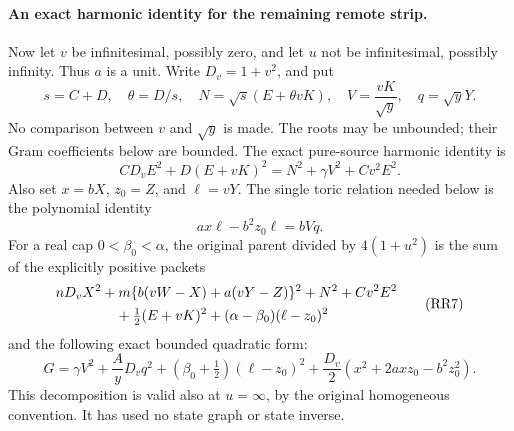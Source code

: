 \paragraph{An exact harmonic identity for the remaining remote strip.}
Now let $v$ be infinitesimal, possibly zero, and let $u$ not be
infinitesimal, possibly infinity.  Thus $a$ is a unit.
Write $D_v=1+v^2$, and put
\[
 s=C+D,\quad\theta=D/s,\quad
 N=\sqrt{s}(E+\theta vK),\quad
 V=\frac{vK}{\sqrt y},\quad q=\sqrt yY.
\]
No comparison between $v$ and $\sqrt y$ is made.  The roots may be
unbounded; their Gram coefficients below are bounded.  The exact
pure-source harmonic identity is
\[
 CD_vE^2+D(E+vK)^2=N^2+\gamma V^2+Cv^2E^2.               \tag{RR5}
\]
Also set $x=bX$, $z_0=Z$, and $\ell=vY$.  The single toric relation
needed below is the polynomial identity
\[
 a x\ell-b^2z_0\ell=bVq.                                \tag{RR6}
\]
For a real cap $0<\beta_0<\alpha$, the original parent divided
by $4(1+u^2)$ is the sum of the explicitly positive packets
\[
 \begin{split}
 &nD_vX^2+m\{b(vW-X)+a(vY-Z)\}^2+N^2+Cv^2E^2\\
 &\hspace{15mm}+\tfrac12(E+vK)^2+(\alpha-\beta_0)(\ell-z_0)^2
 \end{split}                                             \tag{RR7}
\]
and the following exact bounded quadratic form:
\[
 G=\gamma V^2+\frac AyD_vq^2
 +(\beta_0+\tfrac12)(\ell-z_0)^2
 +\frac{D_v}{2}(x^2+2axz_0-b^2z_0^2).                   \tag{RR8}
\]
This decomposition is valid also at $u=\infty$, by the original
homogeneous convention.  It has used no state graph or state inverse.

